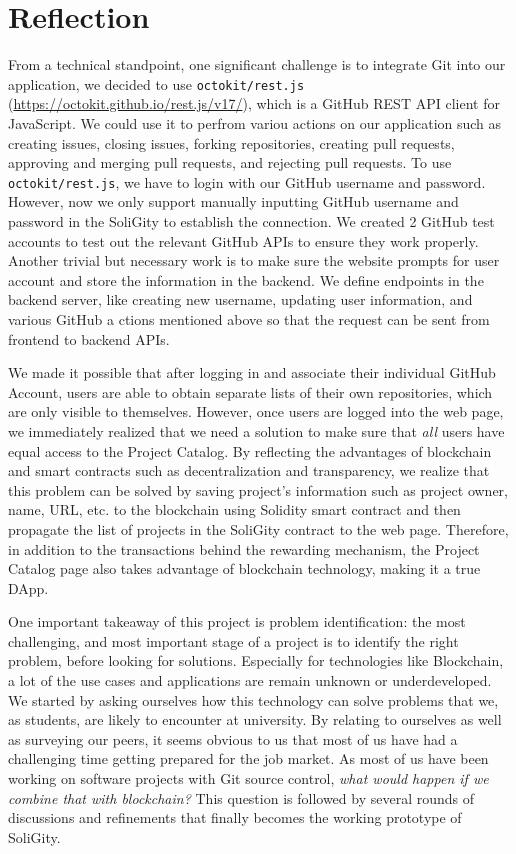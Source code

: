 \documentclass[12pt]{article}
\renewcommand{\_}{\kern-1.5pt\textunderscore\kern-1.5pt}
\begin{document}
\renewcommand\thesection{\arabic{section}}
\renewcommand\thesubsection{\thesection.\arabic{subsection}}

\section{Reflection}

From a technical standpoint, one significant challenge is to integrate Git into our application, we decided to
use \texttt{octokit/rest.js} (\url{https://octokit.github.io/rest.js/v17/}), which is a GitHub REST API client for
JavaScript. We could use it to perfrom variou actions on our application such as creating issues, closing issues,
forking repositories, creating pull requests, approving and merging pull requests, and rejecting pull requests.
To use \texttt{octokit/rest.js}, we have to login with our GitHub username and password. However, now we only
support manually inputting GitHub username and password in the SoliGity to establish the connection. We created
2 GitHub test accounts to test out the relevant GitHub APIs to ensure they work properly. Another trivial but
necessary work is to make sure the website prompts for user account and store the information in the backend.
We define endpoints in the backend server, like creating new username, updating user information, and various GitHub
a ctions mentioned above so that the request can be sent from frontend to backend APIs.

We made it possible that after logging in and associate their individual GitHub Account, users are able to obtain
separate lists of their own repositories, which are only visible to themselves. However, once users are logged
into the web page, we immediately realized that we need a solution to make sure that \textit{all} users have equal
access to the Project Catalog. By reflecting the advantages of blockchain and smart contracts such as decentralization
and transparency, we realize that this problem can be solved by saving project's information such as project owner,
name, URL, etc. to the blockchain using Solidity smart contract and then propagate the list of projects in the
SoliGity contract to the web page. Therefore, in addition to the transactions behind the rewarding mechanism,
the Project Catalog page also takes advantage of blockchain technology, making it a true DApp.

One important takeaway of this project is problem identification: the most challenging, and most important stage
of a project is to identify the right problem, before looking for solutions. Especially for technologies like
Blockchain, a lot of the use cases and applications are remain unknown or underdeveloped. We started by asking
ourselves how this technology can solve problems that we, as students, are likely to encounter at university.
By relating to ourselves as well as surveying our peers, it seems obvious to us that most of us have had a
challenging time getting prepared for the job market. As most of us have been working on software projects with
Git source control, \textit{what would happen if we combine that with blockchain?} This question is followed by
several rounds of discussions and refinements that finally becomes the working prototype of SoliGity.
\end{document}
